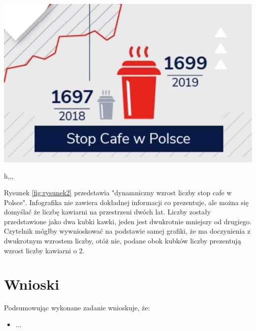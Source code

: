 \documentclass{classrep}
\begin{document}
{        %
              \includegraphics[width=\linewidth]{2.jpg}
              \caption{h,,,}
              \label{fig:rysunek2}
        \par
       Rysunek \ref{fig:rysunek2} przedstawia "dynamniczny wzrost liczby stop cafe w Polsce". Infografika nie zawiera dokładnej 
       informacji co prezentuje, ale można się domyślać że liczbę kawiarni na przestrzeni dwóch lat. 
       Liczby zostały przedstawione jako dwa kubki kawki, jeden jest dwukrotnie mniejszy od drugiego.
        Czytelnik mógłby wywnioskować na podstawie samej grafiki, że ma doczynienia z dwukrotnym wzrostem liczby, 
        otóż nie, podane obok kubków liczby prezentują wzrost liczby kawiarni o 2.
       
}

    
    \section{Wnioski} {
        Podsumowując wykonane zadanie wnioskuje, że:
        \begin{itemize}
            \item ...

        \end{itemize}
    }

    \begin{thebibliography}{0}
    \end{thebibliography}
\end{document}
